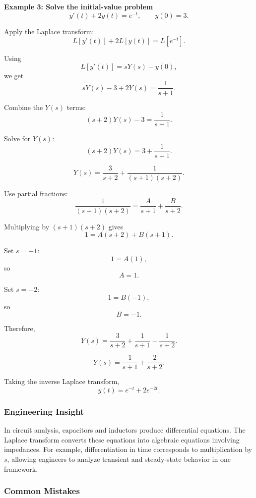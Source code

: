 \begin{examplebox}
    \textbf{Example 3: Solve the initial-value problem}
    \[
        y'(t)+2y(t)=e^{-t}, \qquad y(0)=3.
    \]

    Apply the Laplace transform:
    \[
        L[y'(t)] + 2L[y(t)] = L[e^{-t}].
    \]

    Using
    \[
        L[y'(t)] = sY(s)-y(0),
    \]
    we get
    \[
        sY(s)-3+2Y(s)=\frac{1}{s+1}.
    \]

    Combine the $Y(s)$ terms:
    \[
        (s+2)Y(s)-3=\frac{1}{s+1}.
    \]

    Solve for $Y(s)$:
    \[
        (s+2)Y(s)=3+\frac{1}{s+1}.
    \]

    \[
        Y(s)=\frac{3}{s+2}+\frac{1}{(s+1)(s+2)}.
    \]

    Use partial fractions:
    \[
        \frac{1}{(s+1)(s+2)}
        =
        \frac{A}{s+1}+\frac{B}{s+2}.
    \]

    Multiplying by $(s+1)(s+2)$ gives
    \[
        1=A(s+2)+B(s+1).
    \]

    Set $s=-1$:
    \[
        1=A(1),
    \]
    so
    \[
        A=1.
    \]

    Set $s=-2$:
    \[
        1=B(-1),
    \]
    so
    \[
        B=-1.
    \]

    Therefore,
    \[
        Y(s)=\frac{3}{s+2}+\frac{1}{s+1}-\frac{1}{s+2}.
    \]

    \[
        Y(s)=\frac{1}{s+1}+\frac{2}{s+2}.
    \]

    Taking the inverse Laplace transform,
    \[
        y(t)=e^{-t}+2e^{-2t}.
    \]
\end{examplebox}

\subsubsection*{Engineering Insight}

\begin{noteBox}
    In circuit analysis, capacitors and inductors produce differential equations. The Laplace transform converts these equations into algebraic equations involving impedances. For example, differentiation in time corresponds to multiplication by $s$, allowing engineers to analyze transient and steady-state behavior in one framework.
\end{noteBox}

\subsubsection*{Common Mistakes}

